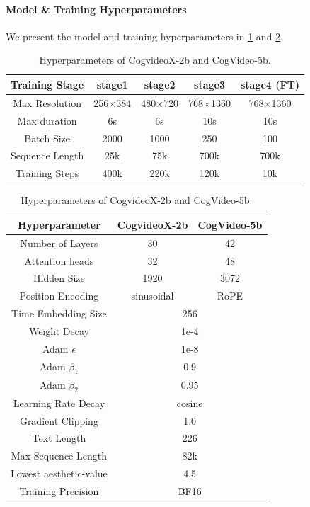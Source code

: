 \paragraph{Model \& Training Hyperparameters}
We present the model and training hyperparameters in \cref{tab:hyper2} and \cref{tab:hyper}.

\begin{table}[htbp]
\centering
\small
\begin{tabular}{ccccc}
\toprule
\textbf{Training Stage} & \textbf{stage1} & \textbf{stage2} & \textbf{stage3} & \textbf{stage4 (FT)} \\ 
\midrule
Max Resolution & 256$\times$384 & 480$\times$720 & 768$\times$1360& 768$\times$1360 \\
Max duration & 6s & 6s & 10s & 10s \\
Batch Size & 2000 & 1000 & 250 & 100 \\
Sequence Length & 25k & 75k & 700k & 700k \\
Training Steps & 400k & 220k & 120k & 10k \\

\bottomrule
\end{tabular}
\caption{Hyperparameters of CogvideoX-2b and CogVideo-5b.}
\label{tab:hyper2}
\end{table}

\begin{table}[htbp]
\centering
\small
\vspace{-2em}
\begin{tabular}{ccc}
\toprule
\textbf{Hyperparameter} & \textbf{CogvideoX-2b} & \textbf{CogVideo-5b} \\ 
\midrule
Number of Layers & 30 & 42 \\ 
Attention heads & 32 & 48 \\ 
Hidden Size & 1920 & 3072 \\
Position Encoding & sinusoidal & RoPE \\
Time Embedding Size & \multicolumn{2}{c}{256} \\
Weight Decay & \multicolumn{2}{c}{1e-4} \\
Adam $\epsilon$ & \multicolumn{2}{c}{1e-8} \\
Adam $\beta_1$ & \multicolumn{2}{c}{0.9} \\
Adam $\beta_2$ & \multicolumn{2}{c}{0.95} \\
Learning Rate Decay & \multicolumn{2}{c}{cosine} \\
Gradient Clipping & \multicolumn{2}{c}{1.0} \\
Text Length & \multicolumn{2}{c}{226} \\ 
Max Sequence Length & \multicolumn{2}{c}{82k} \\
Lowest aesthetic-value & \multicolumn{2}{c}{4.5} \\
Training Precision & \multicolumn{2}{c}{BF16} \\
\bottomrule
\end{tabular}
\caption{Hyperparameters of CogvideoX-2b and CogVideo-5b.}
\label{tab:hyper}
\end{table}



